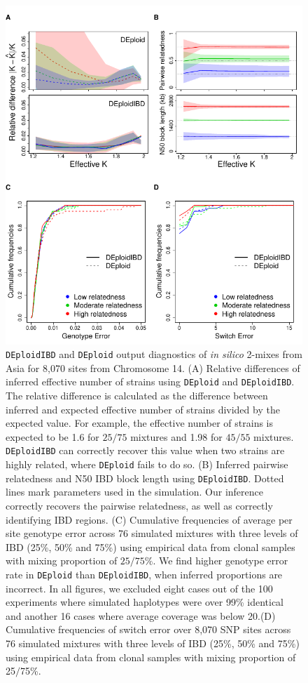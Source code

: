 \documentclass[9pt,lineno]{elife}
\begin{document}
\begin{figure}[htp]
  \begin{center}
  \includegraphics[width=.9\textwidth]{Fig2.pdf}
  \caption{\texttt{DEploidIBD} and \texttt{DEploid} output diagnostics of {\it in silico} 2-mixes from Asia for 8,070 sites from Chromosome 14. (A) Relative differences of inferred effective number of strains using \texttt{DEploid} and \texttt{DEploidIBD}. The relative difference is calculated as the difference between inferred and expected effective number of strains divided by the expected value. For example, the effective number of strains is expected to be 1.6 for $25/75$ mixtures and 1.98 for $45/55$ mixtures. \texttt{DEploidIBD} can correctly recover this value when two strains are highly related, where \texttt{DEploid} fails to do so. (B) Inferred pairwise relatedness and N50 IBD block length using \texttt{DEploidIBD}. Dotted lines mark parameters used in the simulation. Our inference correctly recovers the pairwise relatedness, as well as correctly identifying IBD regions. (C) Cumulative frequencies of average per site genotype error across 76 simulated mixtures with three levels of IBD (25\%, 50\% and 75\%) using empirical data from clonal samples with mixing proportion of $25/75\%$. We find higher genotype error rate in \texttt{DEploid} than \texttt{DEploidIBD}, when inferred proportions are incorrect. In all figures, we excluded eight cases out of the 100 experiments where simulated haplotypes were over 99\% identical and another 16 cases where average coverage was below 20.(D) Cumulative frequencies of switch error over 8,070 SNP sites across 76 simulated mixtures with three levels of IBD (25\%, 50\% and 75\%) using empirical data from clonal samples with mixing proportion of 25$\slash$75\%.
}
\end{center}
\end{figure}
\end{document}
